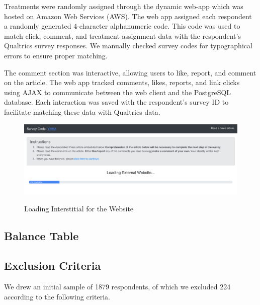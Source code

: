 \documentclass[]{article}
\begin{document}
Treatments were randomly assigned through the dynamic web-app which was hosted on Amazon Web Services (AWS). The web app assigned each respondent a randomly generated 4-character alphanumeric code. This code was used to match click, comment, and treatment assignment data with the respondent's Qualtrics survey responses. We manually checked survey codes for typographical errors to ensure proper matching.

The comment section was interactive, allowing users to like, report, and comment on the article. The web app tracked comments, likes, reports, and link clicks using AJAX to communicate between the web client and the PostgreSQL database. Each interaction was saved with the respondent's survey ID to facilitate matching these data with Qualtrics data.

\vspace{-1em}
\begin{figure}[!htbp]
  \centering
  \caption{Loading Interstitial for the Website}
  \vspace{1em}
  \includegraphics[width=.9\textwidth]{figures/loading_interstitial.pdf}\\
  \label{hom_uns}
\end{figure}

\subsection{Balance Table}



\subsection{Exclusion Criteria}

We drew an initial sample of 1879 respondents, of which we excluded 224 according to the following criteria.
\end{document}

